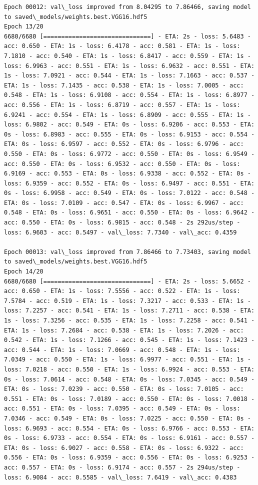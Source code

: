 \documentclass[11pt]{article}
\begin{document}
\begin{Verbatim}[commandchars=\\\{\}]
Epoch 00012: val\_loss improved from 8.04295 to 7.86466, saving model to saved\_models/weights.best.VGG16.hdf5
Epoch 13/20
6680/6680 [==============================] - ETA: 2s - loss: 5.6483 - acc: 0.650 - ETA: 1s - loss: 6.4178 - acc: 0.581 - ETA: 1s - loss: 7.1810 - acc: 0.540 - ETA: 1s - loss: 6.8417 - acc: 0.559 - ETA: 1s - loss: 6.9963 - acc: 0.551 - ETA: 1s - loss: 6.9632 - acc: 0.551 - ETA: 1s - loss: 7.0921 - acc: 0.544 - ETA: 1s - loss: 7.1663 - acc: 0.537 - ETA: 1s - loss: 7.1435 - acc: 0.538 - ETA: 1s - loss: 7.0005 - acc: 0.548 - ETA: 1s - loss: 6.9108 - acc: 0.554 - ETA: 1s - loss: 6.8977 - acc: 0.556 - ETA: 1s - loss: 6.8719 - acc: 0.557 - ETA: 1s - loss: 6.9241 - acc: 0.554 - ETA: 1s - loss: 6.8909 - acc: 0.555 - ETA: 1s - loss: 6.9802 - acc: 0.549 - ETA: 0s - loss: 6.9206 - acc: 0.553 - ETA: 0s - loss: 6.8983 - acc: 0.555 - ETA: 0s - loss: 6.9153 - acc: 0.554 - ETA: 0s - loss: 6.9597 - acc: 0.552 - ETA: 0s - loss: 6.9796 - acc: 0.550 - ETA: 0s - loss: 6.9772 - acc: 0.550 - ETA: 0s - loss: 6.9549 - acc: 0.550 - ETA: 0s - loss: 6.9532 - acc: 0.550 - ETA: 0s - loss: 6.9169 - acc: 0.553 - ETA: 0s - loss: 6.9338 - acc: 0.552 - ETA: 0s - loss: 6.9359 - acc: 0.552 - ETA: 0s - loss: 6.9497 - acc: 0.551 - ETA: 0s - loss: 6.9958 - acc: 0.549 - ETA: 0s - loss: 7.0122 - acc: 0.548 - ETA: 0s - loss: 7.0109 - acc: 0.547 - ETA: 0s - loss: 6.9967 - acc: 0.548 - ETA: 0s - loss: 6.9651 - acc: 0.550 - ETA: 0s - loss: 6.9642 - acc: 0.550 - ETA: 0s - loss: 6.9815 - acc: 0.548 - 2s 292us/step - loss: 6.9603 - acc: 0.5497 - val\_loss: 7.7340 - val\_acc: 0.4359

Epoch 00013: val\_loss improved from 7.86466 to 7.73403, saving model to saved\_models/weights.best.VGG16.hdf5
Epoch 14/20
6680/6680 [==============================] - ETA: 2s - loss: 5.6652 - acc: 0.650 - ETA: 1s - loss: 7.5556 - acc: 0.522 - ETA: 1s - loss: 7.5784 - acc: 0.519 - ETA: 1s - loss: 7.3217 - acc: 0.533 - ETA: 1s - loss: 7.2257 - acc: 0.541 - ETA: 1s - loss: 7.2711 - acc: 0.538 - ETA: 1s - loss: 7.3256 - acc: 0.535 - ETA: 1s - loss: 7.2258 - acc: 0.541 - ETA: 1s - loss: 7.2684 - acc: 0.538 - ETA: 1s - loss: 7.2026 - acc: 0.542 - ETA: 1s - loss: 7.1266 - acc: 0.545 - ETA: 1s - loss: 7.1423 - acc: 0.544 - ETA: 1s - loss: 7.0669 - acc: 0.548 - ETA: 1s - loss: 7.0349 - acc: 0.550 - ETA: 1s - loss: 6.9977 - acc: 0.551 - ETA: 1s - loss: 7.0218 - acc: 0.550 - ETA: 1s - loss: 6.9924 - acc: 0.553 - ETA: 0s - loss: 7.0614 - acc: 0.548 - ETA: 0s - loss: 7.0345 - acc: 0.549 - ETA: 0s - loss: 7.0239 - acc: 0.550 - ETA: 0s - loss: 7.0105 - acc: 0.551 - ETA: 0s - loss: 7.0189 - acc: 0.550 - ETA: 0s - loss: 7.0018 - acc: 0.551 - ETA: 0s - loss: 7.0395 - acc: 0.549 - ETA: 0s - loss: 7.0346 - acc: 0.549 - ETA: 0s - loss: 7.0225 - acc: 0.550 - ETA: 0s - loss: 6.9693 - acc: 0.554 - ETA: 0s - loss: 6.9766 - acc: 0.553 - ETA: 0s - loss: 6.9733 - acc: 0.554 - ETA: 0s - loss: 6.9161 - acc: 0.557 - ETA: 0s - loss: 6.9027 - acc: 0.558 - ETA: 0s - loss: 6.9322 - acc: 0.556 - ETA: 0s - loss: 6.9359 - acc: 0.556 - ETA: 0s - loss: 6.9253 - acc: 0.557 - ETA: 0s - loss: 6.9174 - acc: 0.557 - 2s 294us/step - loss: 6.9084 - acc: 0.5585 - val\_loss: 7.6419 - val\_acc: 0.4383


\end{Verbatim}
\end{document}
